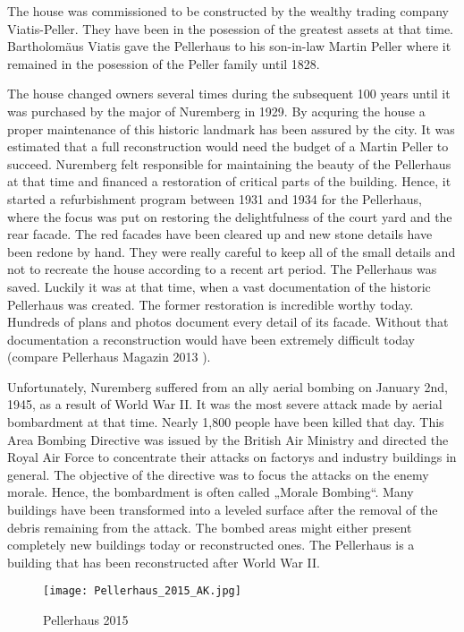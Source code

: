 The house was commissioned to be constructed by the wealthy trading company Viatis-Peller. They have been in the posession of the greatest assets at that time. Bartholomäus Viatis gave the Pellerhaus to his son-in-law Martin Peller where it remained in the posession of the Peller family until 1828.

The house changed owners several times during the subsequent 100 years until it was purchased by the major of Nuremberg in 1929. By acquring the house a proper maintenance of this historic landmark has been assured by the city. It was estimated that a full reconstruction would need the budget of a Martin Peller to succeed. Nuremberg felt responsible for maintaining the beauty of the Pellerhaus at that time and financed a restoration of critical parts of the building. Hence, it started a refurbishment program between 1931 and 1934 for the Pellerhaus, where the focus was put on restoring the delightfulness of the court yard and the rear facade. The red facades have been cleared up and new stone details have been redone by hand. They were really careful to keep all of the small details and not to recreate the house according to a recent art period. The Pellerhaus was saved. Luckily it was at that time, when a vast documentation of the historic Pellerhaus was created. The former restoration is incredible worthy today. Hundreds of plans and photos document every detail of its facade. Without that documentation a reconstruction would have been extremely difficult today (compare Pellerhaus Magazin 2013 \parencite{afPellerhausMagazin02}).

Unfortunately, Nuremberg suffered from an ally aerial bombing on January 2nd, 1945, as a result of World War II. It was the most severe attack made by aerial bombardment at that time. Nearly 1,800 people have been killed that day. This Area Bombing Directive was issued by the British Air Ministry and directed the Royal Air Force to concentrate their attacks on factorys and industry buildings in general. The objective of the directive was to focus the attacks on the enemy morale. Hence, the bombardment is often called „Morale Bombing“. Many buildings have been transformed into a leveled surface after the removal of the debris remaining from the attack. The bombed areas might either present completely new buildings today or reconstructed ones. The Pellerhaus is a building that has been reconstructed after World War II.

\pagebreak

\begin{wrapfigure}{l}{0.5\textwidth}
	
	\centering
	
	\texttt{[image: Pellerhaus\_2015\_AK.jpg]}
	\caption{Pellerhaus 2015}
	\label{fig:pellerhaus_2015}
	\vspace{-10pt}
	
\end{wrapfigure}

